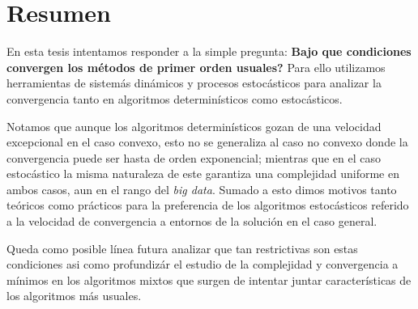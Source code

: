 \begingroup
\let\clearpage\relax
\let\cleardoublepage\relax
\let\cleardoublepage\relax

\chapter*{Resumen}

En esta tesis intentamos responder a la simple pregunta: \textbf{Bajo que condiciones convergen los m\'etodos de primer orden usuales?} Para ello utilizamos herramientas de sistem\'as din\'amicos y procesos estoc\'asticos para analizar la convergencia tanto en algoritmos determin\'isticos como estoc\'asticos. 


Notamos que aunque los algoritmos determin\'isticos gozan de una velocidad excepcional en el caso convexo, esto no se generaliza al caso no convexo donde la convergencia puede ser hasta de orden exponencial; mientras que en el caso estoc\'astico la misma naturaleza de este garantiza una complejidad uniforme en ambos casos, aun en el rango del \textit{big data}. Sumado a esto dimos motivos tanto te\'oricos como pr\'acticos para la preferencia de los algoritmos estoc\'asticos referido a la velocidad de convergencia a entornos de la soluci\'on en el caso general.


Queda como posible l\'inea futura analizar que tan restrictivas son estas condiciones asi como profundiz\'ar el estudio de la complejidad y convergencia a m\'inimos en los algoritmos mixtos que surgen de intentar juntar caracter\'isticas de los algoritmos m\'as usuales.

\endgroup

\vfill
